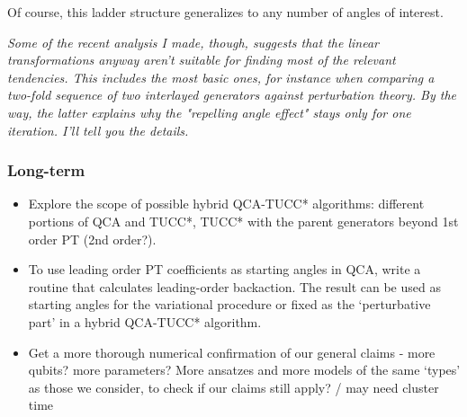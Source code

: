 \documentclass[10pt, a4paper]{article}
\begin{document}
\begin{itemize}
Of course, this ladder structure generalizes to any number of angles of interest.

\textit{Some of the recent analysis I made, though, suggests that the linear transformations anyway aren't suitable for finding most of the relevant tendencies. This includes the most basic ones, for instance when comparing a two-fold sequence of two interlayed generators against perturbation theory. By the way, the latter explains why the "repelling angle effect" stays only for one iteration. I'll tell you the details.}

\end{itemize}

\subsubsection*{Long-term}
\begin{itemize}

\item Explore the scope of possible hybrid QCA-TUCC* algorithms: different portions of QCA and TUCC*, TUCC* with the parent generators beyond 1st order PT (2nd order?).

\item To use leading order PT coefficients as starting angles in QCA, write a routine that calculates leading-order backaction. The result can be used as starting angles for the variational procedure or fixed as the `perturbative part' in a hybrid QCA-TUCC* algorithm.

\item Get a more thorough numerical confirmation of our general claims - more qubits? more parameters? More ansatzes and more models of the same `types' as those we consider, to check if our claims still apply? / may need cluster time

\end{itemize}
\end{document}
